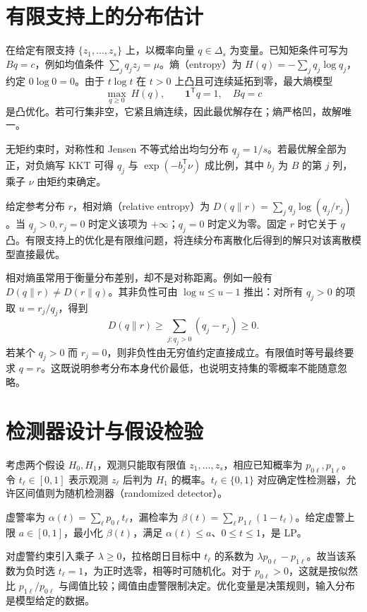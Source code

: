 \section{有限支持上的分布估计}

在给定有限支持 $\{z_1,\ldots,z_s\}$ 上，以概率向量 $q\in\Delta_s$ 为变量。已知矩条件可写为 $Bq=c$，例如均值条件 $\sum_jq_jz_j=\mu$。熵（entropy）为 $H(q)=-\sum_jq_j\log q_j$，约定 $0\log0=0$。由于 $t\log t$ 在 $t>0$ 上凸且可连续延拓到零，最大熵模型
\[
 \max_{q\geq0}\ H(q),\qquad \mathbf1^{\mathsf T}q=1,\quad Bq=c
\]
是凸优化。若可行集非空，它紧且熵连续，因此最优解存在；熵严格凹，故解唯一。

无矩约束时，对称性和 Jensen 不等式给出均匀分布 $q_j=1/s$。若最优解全部为正，对负熵写 KKT 可得 $q_j$ 与 $\exp(-b_j^{\mathsf T}\nu)$ 成比例，其中 $b_j$ 为 $B$ 的第 $j$ 列，乘子 $\nu$ 由矩约束确定。

给定参考分布 $r$，相对熵（relative entropy）为 $D(q\|r)=\sum_jq_j\log(q_j/r_j)$。当 $q_j>0,r_j=0$ 时定义该项为 $+\infty$；$q_j=0$ 时定义为零。固定 $r$ 时它关于 $q$ 凸。有限支持上的优化是有限维问题，将连续分布离散化后得到的解只对该离散模型直接最优。

相对熵虽常用于衡量分布差别，却不是对称距离。例如一般有 $D(q\|r)\ne D(r\|q)$。其非负性可由 $\log u\leq u-1$ 推出：对所有 $q_j>0$ 的项取 $u=r_j/q_j$，得到
\[
 D(q\|r)\geq\sum_{j:q_j>0}(q_j-r_j)\geq0.
\]
若某个 $q_j>0$ 而 $r_j=0$，则非负性由无穷值约定直接成立。有限值时等号最终要求 $q=r$。这既说明参考分布本身代价最低，也说明支持集的零概率不能随意忽略。

\section{检测器设计与假设检验}

考虑两个假设 $H_0,H_1$，观测只能取有限值 $z_1,\ldots,z_s$，相应已知概率为 $p_{0\ell},p_{1\ell}$。令 $t_\ell\in[0,1]$ 表示观测 $z_\ell$ 后判为 $H_1$ 的概率。$t_\ell\in\{0,1\}$ 对应确定性检测器，允许区间值则为随机检测器（randomized detector）。

虚警率为 $\alpha(t)=\sum_\ell p_{0\ell}t_\ell$，漏检率为 $\beta(t)=\sum_\ell p_{1\ell}(1-t_\ell)$。给定虚警上限 $a\in[0,1]$，最小化 $\beta(t)$，满足 $\alpha(t)\leq a$、$0\leq t\leq1$，是 LP。

对虚警约束引入乘子 $\lambda\geq0$，拉格朗日目标中 $t_\ell$ 的系数为 $\lambda p_{0\ell}-p_{1\ell}$。故当该系数为负时选 $t_\ell=1$，为正时选零，相等时可随机化。对于 $p_{0\ell}>0$，这就是按似然比 $p_{1\ell}/p_{0\ell}$ 与阈值比较；阈值由虚警限制决定。优化变量是决策规则，输入分布是模型给定的数据。

